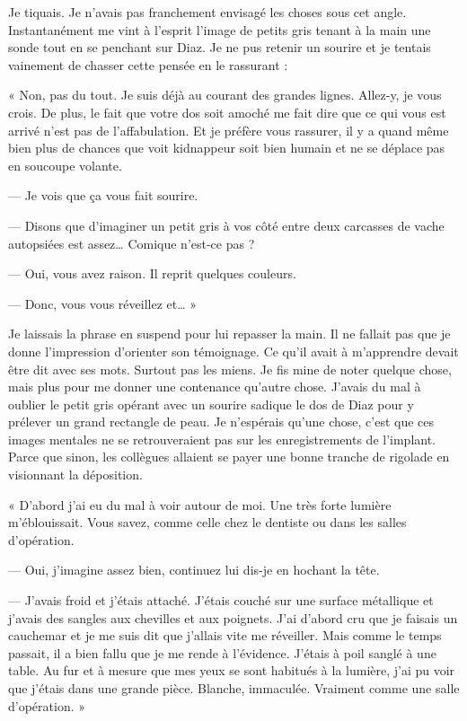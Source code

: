 Je tiquais. Je n'avais pas franchement envisagé les choses sous cet angle. Instantanément me vint à l'esprit l'image de
petits gris tenant à la main une sonde tout en se penchant sur Diaz. Je ne pus retenir un sourire et je tentais 
vainement de chasser cette pensée en le rassurant :

« Non, pas du tout. Je suis déjà au courant des grandes lignes. Allez-y, je vous crois. De plus, le fait que votre dos 
soit amoché me fait dire que ce qui vous est arrivé n'est pas de l'affabulation. Et je préfère vous rassurer, il y a 
quand même bien plus de chances que voit kidnappeur soit bien humain et ne se déplace pas en soucoupe volante.

— Je vois que ça vous fait sourire.

— Disons que d'imaginer un petit gris à vos côté entre deux carcasses de vache autopsiées est assez… Comique n'est-ce
pas ?

— Oui, vous avez raison. Il reprit quelques couleurs.

— Donc, vous vous réveillez et… »

Je laissais la phrase en suspend pour lui repasser la main. Il ne fallait pas que je donne l'impression d'orienter son
témoignage. Ce qu'il avait à m'apprendre devait être dit avec ses mots. Surtout pas les miens. Je fis mine de noter
quelque chose, mais plus pour me donner une contenance qu'autre chose. J'avais du mal à oublier le petit gris opérant 
avec un sourire sadique le dos de Diaz pour y prélever un grand rectangle de peau. Je n'espérais qu'une chose, c'est 
que ces images mentales ne se retrouveraient pas sur les enregistrements de l'implant. Parce que sinon, les collègues 
allaient se payer une bonne tranche de rigolade en visionnant la déposition.

« D'abord j'ai eu du mal à voir autour de moi. Une très forte lumière m'éblouissait. Vous savez, comme celle chez le
dentiste ou dans les salles d'opération.

— Oui, j'imagine assez bien, continuez lui dis-je en hochant la tête.

— J'avais froid et j'étais attaché. J'étais couché sur une surface métallique et j'avais des sangles aux chevilles et
aux poignets. J'ai d'abord cru que je faisais un cauchemar et je me suis dit que j'allais vite me réveiller. Mais comme
le temps passait, il a bien fallu que je me rende à l'évidence. J'étais à poil sanglé à une table. Au fur et à mesure 
que mes yeux se sont habitués à la lumière, j'ai pu voir que j'étais dans une grande pièce. Blanche, immaculée. 
Vraiment comme une salle d'opération. »

